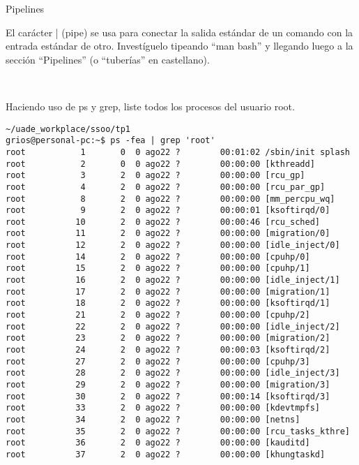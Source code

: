 \begin{section}{Pipelines}


\begin{quoting}
El carácter | (pipe) se usa para conectar la salida estándar de un comando con la entrada estándar de
otro. Investíguelo tipeando “man bash” y llegando luego a la sección “Pipelines” (o “tuberías” en castellano).
\end{quoting}
\\

\begin{quoting}
Haciendo uso de ps y grep, liste todos los procesos del usuario root.
\end{quoting}

\begin{lstlisting}[style=Ubuntu]
~/uade_workplace/ssoo/tp1
grios@personal-pc:~$ ps -fea | grep 'root'
root           1       0  0 ago22 ?        00:01:02 /sbin/init splash
root           2       0  0 ago22 ?        00:00:00 [kthreadd]
root           3       2  0 ago22 ?        00:00:00 [rcu_gp]
root           4       2  0 ago22 ?        00:00:00 [rcu_par_gp]
root           8       2  0 ago22 ?        00:00:00 [mm_percpu_wq]
root           9       2  0 ago22 ?        00:00:01 [ksoftirqd/0]
root          10       2  0 ago22 ?        00:00:46 [rcu_sched]
root          11       2  0 ago22 ?        00:00:00 [migration/0]
root          12       2  0 ago22 ?        00:00:00 [idle_inject/0]
root          14       2  0 ago22 ?        00:00:00 [cpuhp/0]
root          15       2  0 ago22 ?        00:00:00 [cpuhp/1]
root          16       2  0 ago22 ?        00:00:00 [idle_inject/1]
root          17       2  0 ago22 ?        00:00:00 [migration/1]
root          18       2  0 ago22 ?        00:00:00 [ksoftirqd/1]
root          21       2  0 ago22 ?        00:00:00 [cpuhp/2]
root          22       2  0 ago22 ?        00:00:00 [idle_inject/2]
root          23       2  0 ago22 ?        00:00:00 [migration/2]
root          24       2  0 ago22 ?        00:00:03 [ksoftirqd/2]
root          27       2  0 ago22 ?        00:00:00 [cpuhp/3]
root          28       2  0 ago22 ?        00:00:00 [idle_inject/3]
root          29       2  0 ago22 ?        00:00:00 [migration/3]
root          30       2  0 ago22 ?        00:00:14 [ksoftirqd/3]
root          33       2  0 ago22 ?        00:00:00 [kdevtmpfs]
root          34       2  0 ago22 ?        00:00:00 [netns]
root          35       2  0 ago22 ?        00:00:00 [rcu_tasks_kthre]
root          36       2  0 ago22 ?        00:00:00 [kauditd]
root          37       2  0 ago22 ?        00:00:00 [khungtaskd]

\end{lstlisting}
\end{section}
